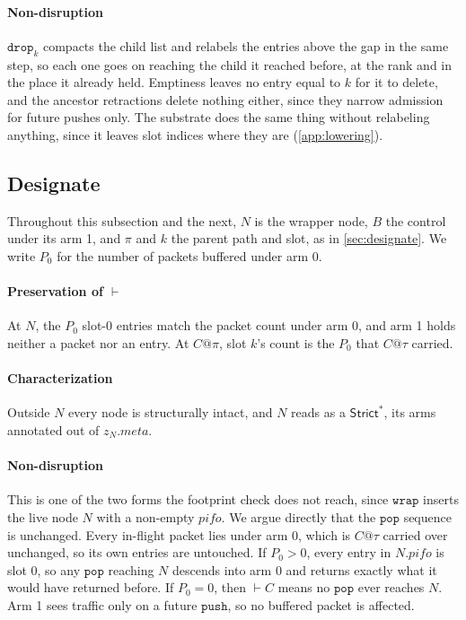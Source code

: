 \documentclass[sigplan,anonymous,review,nonacm]{acmart}
\newcommand{\push}{\ensuremath{\mathtt{push}}}
\newcommand{\pop}{\ensuremath{\mathtt{pop}}}
\newcommand{\notation}[1]{\ensuremath{#1}\ifmmode\else\xspace\fi}
\newcommand{\pifo}{\notation{\mathit{pifo}}}
\newcommand{\Strictstar}{\textsf{Strict}^{*}}
\newcommand{\Designate}{\textsf{Designate}}
\begin{document}
\paragraph{Non-disruption}
\(\mathtt{drop}_k\) compacts the child list and relabels the entries above the gap in the same step, so each one goes on reaching the child it reached before, at the rank and in the place it already held.
Emptiness leaves no entry equal to \(k\) for it to delete, and the ancestor retractions delete nothing either, since they narrow admission for future pushes only.
The substrate does the same thing without relabeling anything, since it leaves slot indices where they are (\cref{app:lowering}).

\subsection{\texorpdfstring{\Designate}{Designate}}\label{sec:check-designate}

Throughout this subsection and the next, \(N\) is the wrapper node, \(B\) the control under its arm 1, and \(\pi\) and \(k\) the parent path and slot, as in \cref{sec:designate}.
We write \(P_0\) for the number of packets buffered under arm 0.

\paragraph{Preservation of \(\vdash\)}
At \(N\), the \(P_0\) slot-\(0\) entries match the packet count under arm 0, and arm 1 holds neither a packet nor an entry.
At \(C@\pi\), slot \(k\)'s count is the \(P_0\) that \(C@\tau\) carried.

\paragraph{Characterization}
Outside \(N\) every node is structurally intact, and \(N\) reads as a \(\Strictstar\), its arms annotated out of \(\mathit{z}_N.\mathit{meta}\).

\paragraph{Non-disruption}
This is one of the two forms the footprint check does not reach, since \(\mathtt{wrap}\) inserts the live node \(N\) with a non-empty \pifo.
We argue directly that the \pop{} sequence is unchanged.
Every in-flight packet lies under arm 0, which is \(C@\tau\) carried over unchanged, so its own entries are untouched.
If \(P_0 > 0\), every entry in \(N.\mathit{pifo}\) is slot \(0\), so any \pop{} reaching \(N\) descends into arm 0 and returns exactly what it would have returned before.
If \(P_0 = 0\), then \(\vdash C\) means no \pop{} ever reaches \(N\).
Arm 1 sees traffic only on a future \push{}, so no buffered packet is affected.
\end{document}
